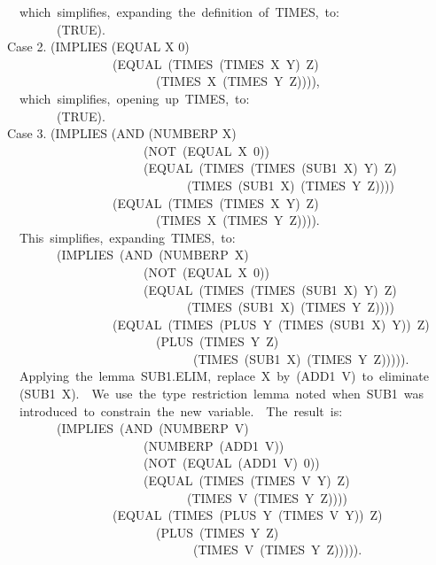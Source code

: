 \documentclass[10pt]{book}
\newenvironment{pubasis}{\begin{flushleft}}{\end{flushleft}}
\begin{document}
\begin{pubasis}
~~which~simplifies,~expanding~the~definition~of~TIMES,~to:\\

~~~~~~~~(TRUE).\\

Case 2.	(IMPLIES (EQUAL X 0)\\
~~~~~~~~~~~~~~~~~(EQUAL~(TIMES~(TIMES~X~Y)~Z)\\
~~~~~~~~~~~~~~~~~~~~~~~~(TIMES~X~(TIMES~Y~Z)))),\\

~~which~simplifies,~opening~up~TIMES,~to:\\

~~~~~~~~(TRUE).\\

Case 3.	(IMPLIES (AND (NUMBERP X)\\
~~~~~~~~~~~~~~~~~~~~~~(NOT~(EQUAL~X~0))\\
~~~~~~~~~~~~~~~~~~~~~~(EQUAL~(TIMES~(TIMES~(SUB1~X)~Y)~Z)\\
~~~~~~~~~~~~~~~~~~~~~~~~~~~~~(TIMES~(SUB1~X)~(TIMES~Y~Z))))\\
~~~~~~~~~~~~~~~~~(EQUAL~(TIMES~(TIMES~X~Y)~Z)\\
~~~~~~~~~~~~~~~~~~~~~~~~(TIMES~X~(TIMES~Y~Z)))).\\

~~This~simplifies,~expanding~TIMES,~to:\\

~~~~~~~~(IMPLIES~(AND~(NUMBERP~X)\\
~~~~~~~~~~~~~~~~~~~~~~(NOT~(EQUAL~X~0))\\
~~~~~~~~~~~~~~~~~~~~~~(EQUAL~(TIMES~(TIMES~(SUB1~X)~Y)~Z)\\
~~~~~~~~~~~~~~~~~~~~~~~~~~~~~(TIMES~(SUB1~X)~(TIMES~Y~Z))))\\
~~~~~~~~~~~~~~~~~(EQUAL~(TIMES~(PLUS~Y~(TIMES~(SUB1~X)~Y))~Z)\\
~~~~~~~~~~~~~~~~~~~~~~~~(PLUS~(TIMES~Y~Z)\\
~~~~~~~~~~~~~~~~~~~~~~~~~~~~~~(TIMES~(SUB1~X)~(TIMES~Y~Z))))).\\

~~Applying~the~lemma~SUB1.ELIM,~replace~X~by~(ADD1~V)~to~eliminate\\
~~(SUB1~X).~~We~use~the~type~restriction~lemma~noted~when~SUB1~was\\
~~introduced~to~constrain~the~new~variable.~~The~result~is:\\

~~~~~~~~(IMPLIES~(AND~(NUMBERP~V)\\
~~~~~~~~~~~~~~~~~~~~~~(NUMBERP~(ADD1~V))\\
~~~~~~~~~~~~~~~~~~~~~~(NOT~(EQUAL~(ADD1~V)~0))\\
~~~~~~~~~~~~~~~~~~~~~~(EQUAL~(TIMES~(TIMES~V~Y)~Z)\\
~~~~~~~~~~~~~~~~~~~~~~~~~~~~~(TIMES~V~(TIMES~Y~Z))))\\
~~~~~~~~~~~~~~~~~(EQUAL~(TIMES~(PLUS~Y~(TIMES~V~Y))~Z)\\
~~~~~~~~~~~~~~~~~~~~~~~~(PLUS~(TIMES~Y~Z)\\
~~~~~~~~~~~~~~~~~~~~~~~~~~~~~~(TIMES~V~(TIMES~Y~Z))))).\\


\end{pubasis}
\end{document}
